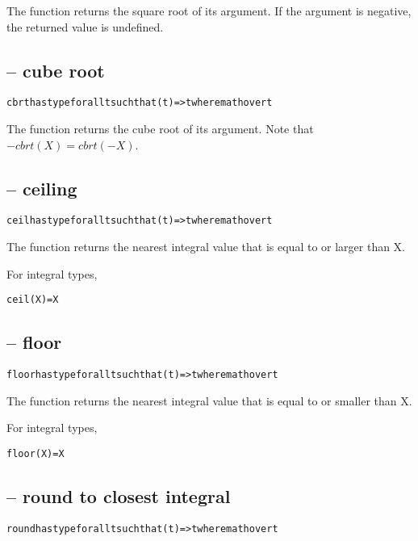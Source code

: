 The  function returns the square root of its argument. If the argument is negative, the returned value is undefined.

\subsection{ -- cube root}
\begin{alltt}
cbrt has type for all t such that (t)=>t where math over t
\end{alltt}

The  function returns the cube root of its argument. Note that $-cbrt(X)=cbrt(-X)$.

\subsection{ -- ceiling}
\begin{alltt}
ceil has type for all t such that (t)=>t where math over t
\end{alltt}

The  function returns the nearest integral value that is equal to or larger than X.
\begin{aside}
For integral types,
\begin{alltt}
ceil(X)=X
\end{alltt}
\end{aside}

\subsection{ -- floor}
\begin{alltt}
floor has type for all t such that (t)=>t where math over t
\end{alltt}

The  function returns the nearest integral value that is equal to or smaller than X.
\begin{aside}
For integral types,
\begin{alltt}
floor(X)=X
\end{alltt}
\end{aside}

\subsection{ -- round to closest integral}
\begin{alltt}
round has type for all t such that (t)=>t where math over t
\end{alltt}

